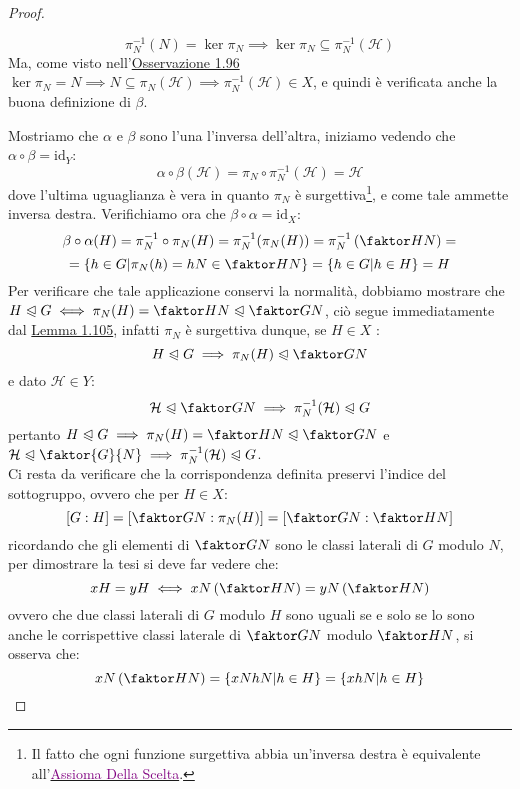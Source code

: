 \documentclass[11pt]{scrartcl}
\begin{document}
\begin{proof}
\begin{itemize}
		\[ \pi_N^{-1}(N) = \ker \pi_N \implies \ker \pi_N \subseteq \pi_N^{-1}(\mathcal{H})
		\]
Ma, come visto nell'\hyperref[g:ker]{Osservazione 1.96} $\ker \pi_N = N \implies N \subseteq \pi_N(\mathcal{H}) \implies \pi_N^{-1}(\mathcal{H}) \in X$, e quindi è verificata anche la buona definizione di $\beta$.
	\end{itemize}
Mostriamo che $\alpha$ e $\beta$ sono l'una l'inversa dell'altra, iniziamo vedendo che $\alpha \circ \beta = \text{id}_Y$:
	\[ \alpha \circ \beta (\mathcal{H})
	=
	\pi_N \circ \pi_N^{-1}(\mathcal{H})
	=
	\mathcal{H}
	\]
dove l'ultima uguaglianza è vera in quanto $\pi_N$ è surgettiva\footnote{Il fatto che ogni funzione surgettiva abbia un'inversa destra
è equivalente all'\href{http://it.wikipedia.org/wiki/Assioma_della_scelta}{\textcolor{purple}{Assioma Della Scelta}}.}, e come tale 
ammette inversa destra. Verifichiamo ora che $\beta \circ \alpha = \text{id}_X$:
	\[ \beta \circ \alpha (H)
	=
	\pi_N^{-1} \circ \pi_N (H)
	=
	\pi_N^{-1}(\pi_N (H))
	=
	\pi_N^{-1}\left(\faktor HN\right)
	=
	\]\[
	=
	\left\{h \in G \m \pi_N(h)=hN \in \faktor HN\right\}
	=
	\left\{h \in G \m h \in H\right\}
	=
	H
	\]
Per verificare che tale applicazione conservi la normalità, dobbiamo mostrare che $H \trianglelefteqslant G \iff \pi_N(H)=\faktor HN \trianglelefteqslant \faktor GN$, ciò segue immediatamente dal \hyperref[g:omonorm]{Lemma 1.105}, infatti $\pi_N$ è surgettiva dunque, se $H \in X$ :
	\[ H \trianglelefteqslant G \implies \pi_N(H) \trianglelefteqslant \faktor  GN
	\]
e dato $\mathcal{H} \in Y$:
	\[ \mathcal{H}\trianglelefteqslant \faktor GN \implies \pi_N^{-1}(\mathcal{H}) \trianglelefteqslant G
	\]
pertanto $H \trianglelefteqslant G \implies \pi_N(H)=\faktor HN \trianglelefteqslant \faktor GN$ e $\mathcal{H
} \trianglelefteqslant \faktor{G}{N} \implies \pi_N^{-1}(\mathcal{H}) \trianglelefteqslant G$.\\
Ci resta da verificare che la corrispondenza definita preservi l'indice del sottogruppo, ovvero che per $H \in X$:
	\[ [G : H] = \left[\faktor GN : \pi_N(H)\right] = \left[\faktor GN : \faktor HN\right]
	\]
ricordando che gli elementi di $\faktor GN$ sono le classi laterali di $G$ modulo $N$, per dimostrare la tesi si deve far vedere che:
	\[ xH = yH \iff xN\left(\faktor HN\right) = yN\left(\faktor HN\right)
	\]
ovvero che due classi laterali di $G$ modulo $H$ sono uguali se e solo se lo sono anche le corrispettive classi laterale di $\faktor GN$ modulo 
$\faktor HN$, si osserva che:
	\[ xN\left(\faktor HN\right) = \left\{xNhN | h\in H\right\} = \left\{xhN | h\in H\right\}
	\]

\end{proof}
\end{document}
